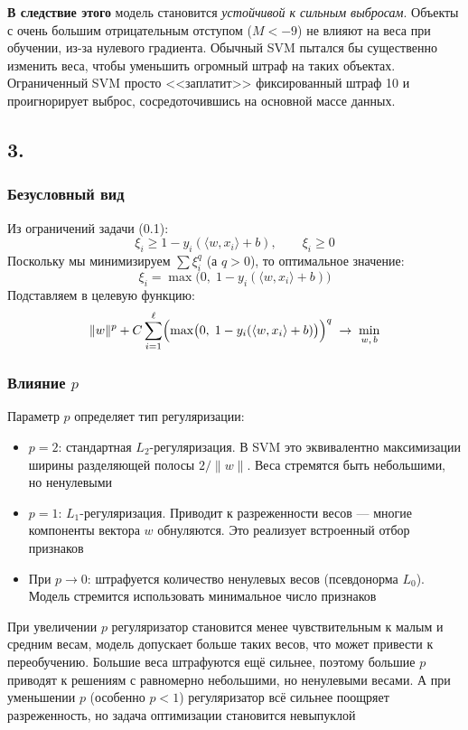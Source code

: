 \documentclass[12pt,a4paper]{article}
\begin{document}
\textbf{В следствие этого} модель становится \textit{устойчивой к сильным выбросам}. Объекты с очень большим отрицательным отступом ($M < -9$) не влияют на веса при обучении, из-за нулевого градиента. Обычный SVM пытался бы существенно изменить веса, чтобы уменьшить огромный штраф на таких объектах. Ограниченный SVM просто <<заплатит>> фиксированный штраф 10 и проигнорирует выброс, сосредоточившись на основной массе данных.

\subsection*{3.}

\subsubsection*{Безусловный вид}

Из ограничений задачи (0.1):
\[
\xi_i \geqslant 1 - y_i(\langle w, x_i\rangle + b), \qquad \xi_i \geqslant 0
\]
Поскольку мы минимизируем $\sum \xi_i^q$ (а $q > 0$), то оптимальное значение:
\[
\xi_i = \max\bigl(0,\; 1 - y_i(\langle w, x_i\rangle + b)\bigr)
\]
Подставляем в целевую функцию:
\[
\|w\|^p + C\sum_{i=1}^{\ell}\Bigl(\max\bigl(0,\;1 - y_i(\langle w, x_i\rangle + b)\bigr)\Bigr)^q
\;\to\;
\min_{w,\,b}
\]

\subsubsection*{Влияние $p$}

Параметр $p$ определяет тип регуляризации:

\begin{itemize}
\item $p = 2$: стандартная $L_2$-регуляризация. В SVM это эквивалентно максимизации ширины разделяющей полосы $2/\|w\|$. Веса стремятся быть небольшими, но ненулевыми

\item $p = 1$: $L_1$-регуляризация. Приводит к разреженности весов --- многие компоненты вектора $w$ обнуляются. Это реализует встроенный отбор признаков

\item При $p \to 0$: штрафуется количество ненулевых весов (псевдонорма $L_0$). Модель стремится использовать минимальное число признаков
\end{itemize}
При увеличении $p$ регуляризатор становится менее чувствительным к малым и средним весам, модель допускает больше таких весов, что может привести к переобучению. Большие веса штрафуются ещё сильнее, поэтому большие $p$ приводят к решениям с равномерно небольшими, но ненулевыми весами.  А при уменьшении $p$ (особенно $p < 1$) регуляризатор всё сильнее поощряет разреженность, но задача оптимизации становится невыпуклой
\end{document}
